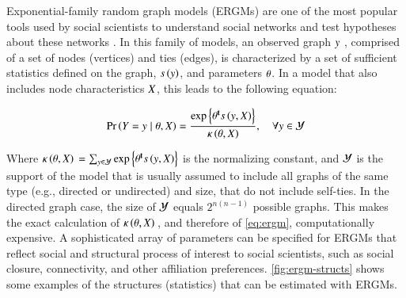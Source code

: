 \documentclass[review, nonatbib,doubleblind]{elsarticle/elsarticle}
\begin{document}
Exponential-family random graph models (ERGMs) are one of the most popular tools used by social scientists to understand social networks and test hypotheses about these networks  \cite[][and others]{Robins2007,Holland1981,Frank1986,Wasserman1996,Snijders2006}. In this family of models, an observed graph $y$ , comprised of a set of nodes (vertices) and ties (edges), is characterized by a set of sufficient statistics defined on the graph, $s\left(y\right)$, and parameters $\theta$. In a model that also includes node characteristics $X$, this leads to the following equation:

\begin{equation}
\label{eq:ergm}
  \Prcond{\Adjmat = \adjmat}{\params, \Indepvar} = \frac{%
  	\exp{\transpose{\params}\sufstats{\adjmat, \Indepvar}}%
  }{
  	\kappa\left(\params, \Indepvar\right)
  },\quad\forall \adjmat\in\ADJMAT
\end{equation}

\noindent Where $\kappa\left(\theta, X\right){} = \sum_{y\in\mathcal{Y}}\mbox{exp}\left\{{\theta}^\mathbf{t}s\left(y, X\right)\right\}$ is the normalizing constant, and $\mathcal{Y}$ is the support of the model that is usually assumed to include all graphs of the same type (e.g., directed or undirected) and size, that do not include self-ties. In the directed graph case, the size of $\mathcal{Y}$ equals $2^{n(n-1)}$ possible graphs. This makes the exact calculation of $\kappa\left(\theta, X\right){}$, and therefore of \eqref{eq:ergm},  computationally expensive. A sophisticated array of parameters can be specified for ERGMs that reflect social and structural process of interest to social scientists, such as social closure, connectivity, and other affiliation preferences.  \autoref{fig:ergm-structs} shows some examples of the structures (statistics) that can be estimated with ERGMs.
\end{document}
